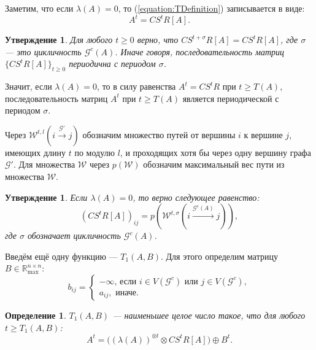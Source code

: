 \documentclass[12pt]{article}
\newtheorem{definition}[theorem]{Определение}
\newtheorem{proposition}[theorem]{Утверждение}
\begin{document}
Заметим, что если $\lambda(A) = 0$, то (\ref{equation:TDefinition}) записывается в виде:
\begin{equation*}
    A^t = CS^tR[A].
\end{equation*}

\begin{proposition} \cite[утверждение 3.2]{21CSRExpansionsOfMatrixPowersInMaxAlgebra}
\label{periodicity}
Для любого $t \ge 0$ верно, что 
$CS^{t+\sigma}R[A] = CS^tR[A]$, где $\sigma$ --- это цикличность $\mathcal{G}^c(A)$. Иначе говоря, последовательность матриц $\{ CS^tR[A]\}_{t\ge0}$ периодична с периодом $\sigma$.
\end{proposition}

Значит, если $\lambda(A) = 0$, то в силу равенства $A^t = CS^tR$ при $t \ge T(A)$, последовательность матриц $A^t$ при $t \ge T(A)$ является периодической с периодом $\sigma$.

Через $\mathcal{W}^{t, l}(i \xrightarrow{\mathcal{G}'} j)$ обозначим множество путей от вершины $i$ к вершине $j$, имеющих длину $t$ по модулю $l$, и проходящих хотя бы через одну вершину графа $\mathcal{G}'$. Для множества $\mathcal{W}$ через $p(\mathcal{W})$ обозначим максимальный вес пути из множества $\mathcal{W}$.

\begin{proposition} \cite[теор. 6.1]{15WeakCSRExpantion}
\label{entriesInCSR}
Если $\lambda(A) = 0$, то верно следующее равенство:
\begin{equation}
    (CS^tR[A])_{ij} = p(\mathcal{W}^{t, \sigma}(i \xrightarrow{\mathcal{G}^c(A)} j)),
\end{equation}
где $\sigma$ обозначает цикличность $\mathcal{G}^c(A)$.
\end{proposition}

Введём ещё одну функцию --- $T_1(A, B)$. Для этого определим матрицу $B \in \mathbb{R}_{\max}^{n \times n}$:
\begin{equation*}
    b_{ij} = 
    \begin{cases}
        -\infty \text{, если $i \in V(\mathcal{G}^c)$ или $j\in V(\mathcal{G}^c)$}, \\
        a_{ij}, \text{ иначе.}
    \end{cases}
\end{equation*}

\begin{definition} \cite[стр. 165]{15WeakCSRExpantion}
\label{T1definition}
$T_1(A, B)$ --- наименьшее целое число такое, что для любого $t \ge T_1(A, B)$:
\begin{equation}
\label{equation:T1definition}
    A^t = \big((\lambda(A))^{\otimes t} \otimes CS^tR[A] \big) \oplus B^t.
\end{equation}
\end{definition}
\end{document}
